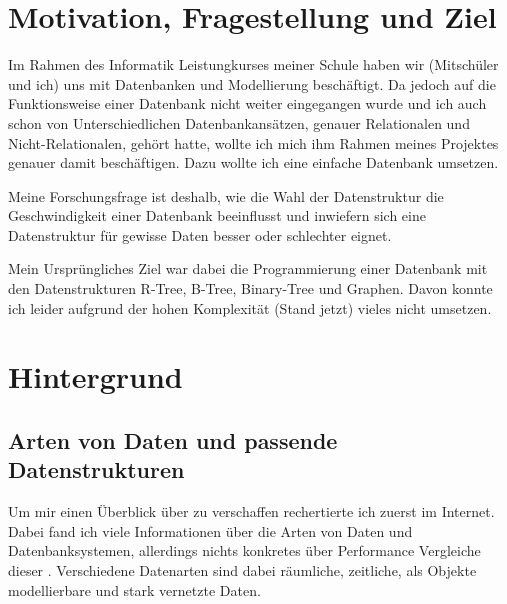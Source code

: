 \documentclass[11pt,a4paper]{article}
\begin{document}

\renewcommand*\contentsname{Inhaltsverzeichnis}

\renewcommand{\cftdot}{}

\tableofcontents

\clearpage

\pagestyle{plain}

\section{Motivation, Fragestellung und Ziel}

Im Rahmen des Informatik Leistungkurses meiner Schule haben wir (Mitschüler und ich) uns
mit Datenbanken und Modellierung beschäftigt. Da jedoch auf die Funktionsweise einer
Datenbank nicht weiter eingegangen wurde und ich auch schon von Unterschiedlichen
Datenbankansätzen, genauer Relationalen und Nicht-Relationalen, gehört hatte,
wollte ich mich ihm Rahmen meines Projektes genauer damit beschäftigen.
Dazu wollte ich eine einfache Datenbank umsetzen.

\vspace*{0.3cm}

Meine Forschungsfrage ist deshalb, wie die Wahl der Datenstruktur die
Geschwindigkeit einer Datenbank beeinflusst und inwiefern sich eine Datenstruktur
für gewisse Daten besser oder schlechter eignet.

\vspace*{0.3cm}

Mein Ursprüngliches Ziel war dabei die Programmierung einer Datenbank
mit den Datenstrukturen R-Tree, B-Tree, Binary-Tree und Graphen.
Davon konnte ich leider aufgrund der hohen Komplexität (Stand jetzt) vieles nicht umsetzen.

\section{Hintergrund}

\subsection{Arten von Daten und passende Datenstrukturen}

Um mir einen Überblick über zu verschaffen rechertierte ich zuerst im Internet.
Dabei fand ich viele Informationen über die Arten von Daten und Datenbanksystemen,
allerdings nichts konkretes über Performance Vergleiche dieser \cite{no_sql_wikipedia} \cite{indian_overview}.
Verschiedene Datenarten sind dabei räumliche, zeitliche, als Objekte modellierbare und stark vernetzte Daten.
\end{document}
